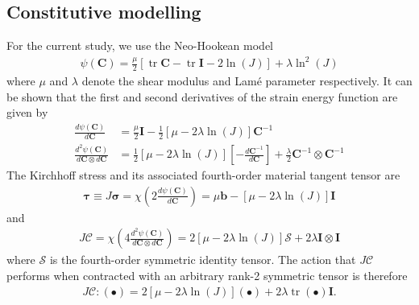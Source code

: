\documentclass[preprint,12pt,times]{elsarticle}
\DeclareMathOperator{\trace}{tr}
\begin{document}
\subsection{Constitutive modelling}

For the current study, we use the Neo-Hookean model
\begin{gather}
\psi \left( \mathbf{C} \right)
  = \frac{\mu}{2} \left[ \trace{\mathbf{C}} - \trace{\mathbf{I}} - 2 \ln\left( J \right) \right]
  + \lambda \ln^{2}\left( J \right)
\end{gather}
where $\mu$ and $\lambda$ denote the shear modulus and Lam\'{e} parameter respectively. It can be shown that the first and second derivatives of the strain energy function are given by
\begin{align}
\frac{d \psi \left( \mathbf{C} \right)}{d \mathbf{C}}
  &= \frac{\mu}{2} \mathbf{I} - \frac{1}{2} \left[ \mu - 2\lambda\ln\left( J \right) \right] \mathbf{C}^{-1} \\
\frac{d^{2} \psi \left( \mathbf{C} \right)}{d \mathbf{C} \otimes d \mathbf{C}}
  &= \frac{1}{2}\left[ \mu - 2\lambda\ln\left( J \right) \right] \left[ - \frac{d \mathbf{C}^{-1}}{d \mathbf{C}} \right]
  + \frac{\lambda}{2} \mathbf{C}^{-1} \otimes \mathbf{C}^{-1}
\end{align}
The Kirchhoff stress and its associated {\color{red}fourth-order material tangent tensor} are
\begin{gather}
\boldsymbol{\tau}
  \equiv J \boldsymbol{\sigma}
  = \chi\left( 2 \frac{d \psi \left( \mathbf{C} \right)}{d \mathbf{C}} \right)
  = \mu \mathbf{b} - \left[ \mu - 2\lambda\ln\left( J \right) \right] \mathbf{I}
\end{gather}
and
\begin{gather}
J \boldsymbol{\mathcal{C}}
  = \chi\left( 4 \frac{d^{2} \psi \left( \mathbf{C} \right)}{d \mathbf{C} \otimes d \mathbf{C}} \right)
  = 2 \left[ \mu - 2\lambda\ln\left( J \right) \right] \boldsymbol{\mathcal{S}}
  + 2 \lambda \mathbf{I} \otimes \mathbf{I}
\end{gather}
where $\boldsymbol{\mathcal{S}}$ is the fourth-order symmetric identity tensor.
The action that $J \boldsymbol{\mathcal{C}}$ performs when contracted with an arbitrary rank-2 symmetric tensor is therefore
\begin{gather}
J \boldsymbol{\mathcal{C}} : \left( \bullet \right)
  = 2 \left[ \mu - 2\lambda\ln\left( J \right) \right] \left( \bullet \right)
  + 2 \lambda \trace\left( \bullet \right) \mathbf{I}.
\label{eq:simplified_action}
\end{gather}
\end{document}
